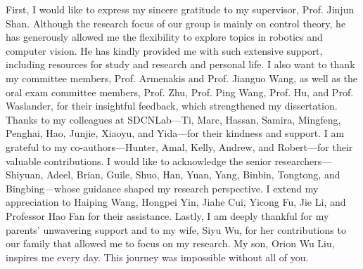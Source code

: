 First, I would like to express my sincere gratitude to my supervisor, Prof. Jinjun Shan. Although the research focus of our group is mainly on control theory, he has generously allowed me the flexibility to explore topics in robotics and computer vision. He has kindly provided me with such extensive support, including resources for study and research and personal life. I also want to thank my committee members, Prof. Armenakis and Prof. Jianguo Wang, as well as the oral exam committee members, Prof. Zhu, Prof. Ping Wang, Prof. Hu, and Prof. Waslander, for their insightful feedback, which strengthened my dissertation.
%
Thanks to my colleagues at SDCNLab—Ti, Marc, Hassan, Samira, Mingfeng, Penghai, Hao, Junjie, Xiaoyu, and Yida—for their kindness and support. I am grateful to my co-authors—Hunter, Amal, Kelly, Andrew, and Robert—for their valuable contributions.
%
I would like to acknowledge the senior researchers—Shiyuan, Adeel, Brian, Guile, Shuo, Han, Yuan, Yang, Binbin, Tongtong, and Bingbing—whose guidance shaped my research perspective.
%
I extend my appreciation to Haiping Wang, Hongpei Yin, Jiahe Cui, Yicong Fu, Jie Li, and Professor Hao Fan for their assistance.
%
Lastly, I am deeply thankful for my parents’ unwavering support and to my wife, Siyu Wu, for her contributions to our family that allowed me to focus on my research. My son, Orion Wu Liu, inspires me every day.
%
This journey was impossible without all of you.